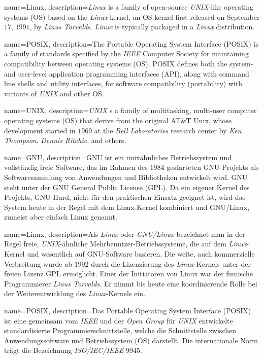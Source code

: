 	{%
		name={Linux},
		description={\textit{Linux} is a family of open-source \textit{UNIX}-like operating systems (OS) based on the \textit{Linux} kernel, an OS kernel first released on September $17$, $1991$, by \textit{Linus Torvalds}. \textit{Linux} is typically packaged in a \textit{Linux} distribution.}
	}

	{%
		name={POSIX},
		description={The Portable Operating System Interface (POSIX) is a family of standards specified by the \textit{IEEE} Computer Society for maintaining compatibility between operating systems (OS). POSIX defines both the system- and user-level application programming interfaces (API), along with command line shells and utility interfaces, for software compatibility (portability) with variants of \textit{UNIX} and other OS.}
	}

	{%
		name={UNIX},
		description={\textit{UNIX} s a family of multitasking, multi-user computer operating systems (OS) that derive from the original AT\&T Unix, whose development started in $1969$ at the \textit{Bell Laboratories} research center by \textit{Ken Thompson}, \textit{Dennis Ritchie}, and others.}
	}

\else

	{%
		name={GNU},
		description={GNU ist ein unixähnliches Betriebssystem und vollständig freie Software, das im Rahmen des 1984 gestarteten GNU-Projekts als Softwaresammlung von Anwendungen und Bibliotheken entwickelt wird. GNU steht unter der GNU General Public License (GPL). Da ein eigener Kernel des Projekts, GNU Hurd, nicht für den praktischen Einsatz geeignet ist, wird das System heute in der Regel mit dem Linux-Kernel kombiniert und GNU/Linux, zumeist aber einfach Linux genannt. }
	}

	{%
		name={Linux},
		description={Als \textit{Linux} oder \textit{GNU/Linux} bezeichnet man in der Regel freie, \textit{UNIX}-ähnliche Mehrbenutzer-Betriebssysteme, die auf dem \textit{Linux}-Kernel und wesentlich auf GNU-Software basieren. Die weite, auch kommerzielle Verbreitung wurde ab $1992$ durch die Lizenzierung des \textit{Linux}-Kernels unter der freien Lizenz GPL ermöglicht. Einer der Initiatoren von Linux war der finnische Programmierer \textit{Linus Torvalds}. Er nimmt bis heute eine koordinierende Rolle bei der Weiterentwicklung des \textit{Linux}-Kernels ein.}
	}

	{%
		name={POSIX},
		description={Das Portable Operating System Interface (POSIX) ist eine gemeinsam vom \textit{IEEE} und der \textit{Open Group} für \textit{UNIX} entwickelte standardisierte Programmierschnittstelle, welche die Schnittstelle zwischen Anwendungssoftware und Betriebssystem (OS) darstellt. Die internationale Norm trägt die Bezeichnung \textit{ISO/IEC/IEEE} $9945$.}
	}

